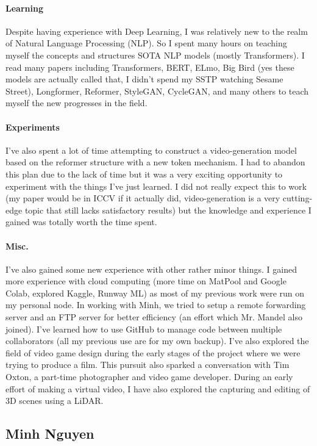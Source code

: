 \documentclass[12pt, letterpaper]{article}
\begin{document}
\paragraph{Learning}Despite having experience with Deep Learning, I was relatively new to the realm of Natural Language Processing (NLP). So I spent many hours on teaching myself the concepts and structures SOTA NLP models (mostly Transformers). I read many papers including Transformers, BERT, ELmo, Big Bird (yes these models are actually called that, I didn't spend my SSTP watching Sesame Street), Longformer, Reformer, StyleGAN, CycleGAN, and many others to teach myself the new progresses in the field.

\paragraph{Experiments}I've also spent a lot of time attempting to construct a video-generation model based on the reformer structure with a new token mechanism. I had to abandon this plan due to the lack of time but it was a very exciting opportunity to experiment with the things I've just learned. I did not really expect this to work (my paper would be in ICCV if it actually did, video-generation is a very cutting-edge topic that still lacks satisfactory results) but the knowledge and experience I gained was totally worth the time spent.

\paragraph{Misc.}I've also gained some new experience with other rather minor things. I gained more experience with cloud computing (more time on MatPool and Google Colab, explored Kaggle, Runway ML) as most of my previous work were run on my personal node. In working with Minh, we tried to setup a remote forwarding server and an FTP server for better efficiency (an effort which Mr. Mandel also joined). I've learned how to use GitHub to manage code between multiple collaborators (all my previous use are for my own backup). I've also explored the field of video game design during the early stages of the project where we were trying to produce a film. This pursuit also sparked a conversation with Tim Oxton, a part-time photographer and video game developer. During an early effort of making a virtual video, I have also explored the capturing and editing of 3D scenes using a LiDAR.


\subsection{Minh Nguyen}
\end{document}
